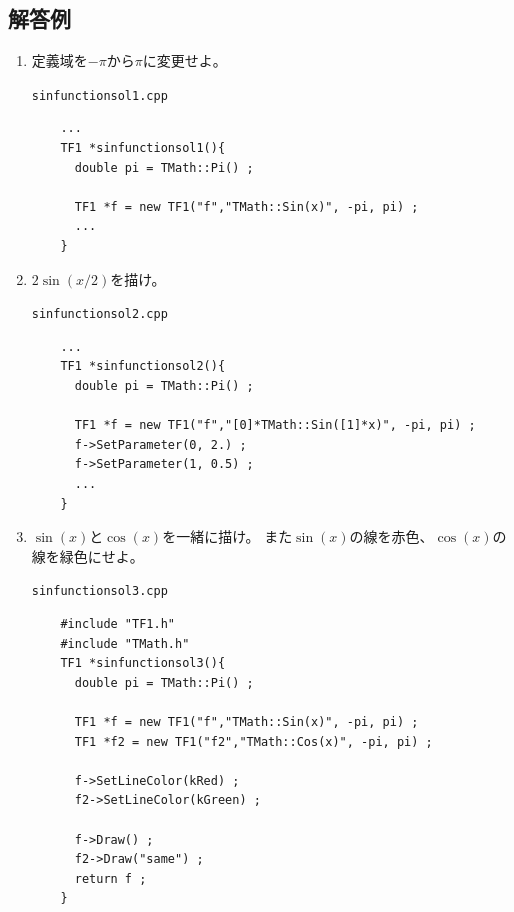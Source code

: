   \subsection{解答例}
  \begin{enumerate}
   \item 定義域を$ -\pi $から$ \pi $に変更せよ。
	 \begin{itembox}{\texttt{sinfunctionsol1.cpp}}
\begin{verbatim}
	...
	TF1 *sinfunctionsol1(){
	  double pi = TMath::Pi() ;

	  TF1 *f = new TF1("f","TMath::Sin(x)", -pi, pi) ;
	  ...
	}
\end{verbatim}
	 \end{itembox}

   \item $2\sin(x/2)$を描け。
	 \begin{itembox}{\texttt{sinfunctionsol2.cpp}}
\begin{verbatim}
	...
	TF1 *sinfunctionsol2(){
	  double pi = TMath::Pi() ;

	  TF1 *f = new TF1("f","[0]*TMath::Sin([1]*x)", -pi, pi) ;
	  f->SetParameter(0, 2.) ;
	  f->SetParameter(1, 0.5) ;
	  ...
	}
\end{verbatim}
	 \end{itembox}
	 
   \item $\sin(x)$と$\cos(x)$を一緒に描け。
	 また$\sin(x)$の線を赤色、$\cos(x)$の線を緑色にせよ。
	 \begin{itembox}{\texttt{sinfunctionsol3.cpp}}
\begin{verbatim}
	#include "TF1.h"
	#include "TMath.h"
	TF1 *sinfunctionsol3(){
	  double pi = TMath::Pi() ;

	  TF1 *f = new TF1("f","TMath::Sin(x)", -pi, pi) ;
	  TF1 *f2 = new TF1("f2","TMath::Cos(x)", -pi, pi) ;

	  f->SetLineColor(kRed) ;
	  f2->SetLineColor(kGreen) ;

	  f->Draw() ;
	  f2->Draw("same") ;
	  return f ;
	}
\end{verbatim}
	 \end{itembox}

  \end{enumerate}